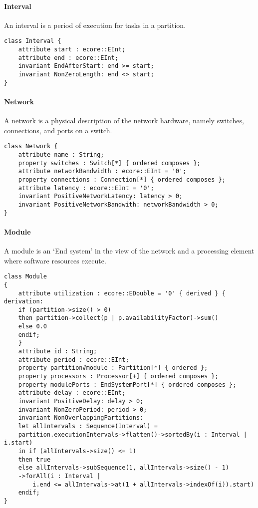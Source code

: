 \paragraph{Interval}
An interval is a period of execution for tasks in a partition.
\begin{lstlisting}[caption=Interval constraints]
class Interval {
    attribute start : ecore::EInt;
    attribute end : ecore::EInt;
    invariant EndAfterStart: end >= start;
    invariant NonZeroLength: end <> start;
}
\end{lstlisting}
\paragraph{Network}
A network is a physical description of the network hardware, namely switches, connections, and ports on a switch.
\begin{lstlisting}[caption=Network constraints]
class Network {
    attribute name : String;
    property switches : Switch[*] { ordered composes };
    attribute networkBandwidth : ecore::EInt = '0';
    property connections : Connection[*] { ordered composes };
    attribute latency : ecore::EInt = '0';
    invariant PositiveNetworkLatency: latency > 0;
    invariant PositiveNetworkBandwith: networkBandwidth > 0;
}
\end{lstlisting}
\paragraph{Module}
A module is an `End system' in the view of the network and a processing element
where software resources execute.
\begin{lstlisting}[caption=Module constraints]
class Module
{
    attribute utilization : ecore::EDouble = '0' { derived } { derivation:
	if (partition->size() > 0)
	then partition->collect(p | p.availabilityFactor)->sum()
	else 0.0
	endif;
    }
    attribute id : String;
    attribute period : ecore::EInt;
    property partition#module : Partition[*] { ordered };
    property processors : Processor[+] { ordered composes };
    property modulePorts : EndSystemPort[*] { ordered composes };
    attribute delay : ecore::EInt;
    invariant PositiveDelay: delay > 0;
    invariant NonZeroPeriod: period > 0;
    invariant NonOverlappingPartitions: 
    let allIntervals : Sequence(Interval) =
    partition.executionIntervals->flatten()->sortedBy(i : Interval | i.start)
    in if (allIntervals->size() <= 1)
    then true
    else allIntervals->subSequence(1, allIntervals->size() - 1)
	->forAll(i : Interval |
	    i.end <= allIntervals->at(1 + allIntervals->indexOf(i)).start)
    endif;
}
\end{lstlisting}
